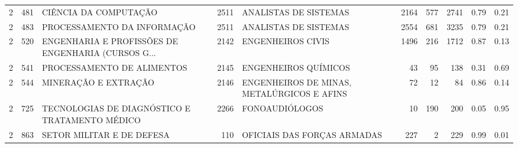 \begin{tabular}{rrlrlrrrrr}
       2 &    481 &                              CIÊNCIA DA COMPUTAÇÃO & 2511 &                      ANALISTAS DE SISTEMAS & 2164 &   577 &   2741 & 0.79 & 0.21 \\
       2 &    483 &                        PROCESSAMENTO DA INFORMAÇÃO & 2511 &                      ANALISTAS DE SISTEMAS & 2554 &   681 &   3235 & 0.79 & 0.21 \\
       2 &    520 & ENGENHARIA E PROFISSÕES DE ENGENHARIA (CURSOS G... & 2142 &                         ENGENHEIROS CIVIS  & 1496 &   216 &   1712 & 0.87 & 0.13 \\
       2 &    541 &                         PROCESSAMENTO DE ALIMENTOS & 2145 &                       ENGENHEIROS QUÍMICOS &   43 &    95 &    138 & 0.31 & 0.69 \\
       2 &    544 &                               MINERAÇÃO E EXTRAÇÃO & 2146 & ENGENHEIROS DE MINAS, METALÚRGICOS E AFINS &   72 &    12 &     84 & 0.86 & 0.14 \\
       2 &    725 &     TECNOLOGIAS DE DIAGNÓSTICO E TRATAMENTO MÉDICO & 2266 &                             FONOAUDIÓLOGOS &   10 &   190 &    200 & 0.05 & 0.95 \\
       2 &    863 &                          SETOR MILITAR E DE DEFESA &  110 &                OFICIAIS DAS FORÇAS ARMADAS &  227 &     2 &    229 & 0.99 & 0.01 \\
\bottomrule
\end{tabular}
